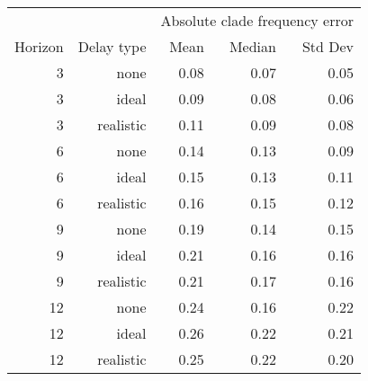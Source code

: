 
\begin{tabular*}{0.7\textwidth}{rrrrr}
\toprule
        &            & \multicolumn{3}{c}{Absolute clade frequency error} \\
Horizon & Delay type & Mean & Median & Std Dev \\
\midrule

3 & none & 0.08 & 0.07 & 0.05 \\
3 & ideal & 0.09 & 0.08 & 0.06 \\
3 & realistic & 0.11 & 0.09 & 0.08 \\
6 & none & 0.14 & 0.13 & 0.09 \\
6 & ideal & 0.15 & 0.13 & 0.11 \\
6 & realistic & 0.16 & 0.15 & 0.12 \\
9 & none & 0.19 & 0.14 & 0.15 \\
9 & ideal & 0.21 & 0.16 & 0.16 \\
9 & realistic & 0.21 & 0.17 & 0.16 \\
12 & none & 0.24 & 0.16 & 0.22 \\
12 & ideal & 0.26 & 0.22 & 0.21 \\
12 & realistic & 0.25 & 0.22 & 0.20 \\

\bottomrule
\end{tabular*}

